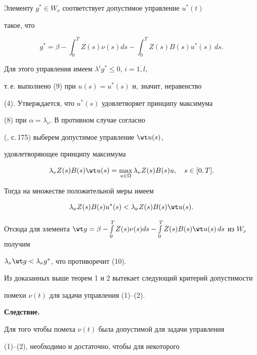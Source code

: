 \begin{pf}
Элементу $g^*\in W_\nu$ соответствует допустимое управление $u^*(t)$


такое, что


$$


g^* = \beta - \int_0^T Z(s)\nu(s)ds - \int_0^T Z(s)B(s)u^*(s)\,ds.


$$


Для этого управления имеем $\lambda^ig^* \le 0$, $i=\overline{1,l}$,


т.\,е. выполнено (9) при $u(s) = u^*(s)$ и, значит, неравенство


(4). Утверждается, что $u^*(s)$ удовлетворяет принципу максимума


(8) при $\alpha = \lambda_\nu$. В противном случае согласно


(\cite{10}, с.\,175) выберем допустимое управление $\wt u(s)$,


удовлетворяющее принципу максимума


$$


\lambda_\nu Z(s)B(s)\wt u(s) = \max_{u\in\Omega}\lambda_\nu Z(s)B(s)u,


\quad s\in[0,T].


$$


Тогда на множестве положительной меры имеем


$$


\lambda_\nu Z(s)B(s)u^*(s) < \lambda_\nu Z(s)B(s)\wt u(s).


$$


Отсюда для элемента $\wt g = \beta - \int\limits_0^T Z(s)\nu(s)ds -


\int\limits_0^T Z(s)B(s)\wt u(s)\,ds$ из $W_\nu$ получим


$\lambda_\nu \wt g < \lambda_\nu g^*$, что противоречит (10).


\end{pf}





Из доказанных выше теорем 1 и 2 вытекает следующий критерий допустимости


помехи $\nu(t)$ для задачи управления (1)--(2).


\medskip








{\bf Следствие.}


Для того чтобы помеха $\nu(t)$ была допустимой для задачи управления


(1)--(2), необходимо и достаточно, чтобы для некоторого


